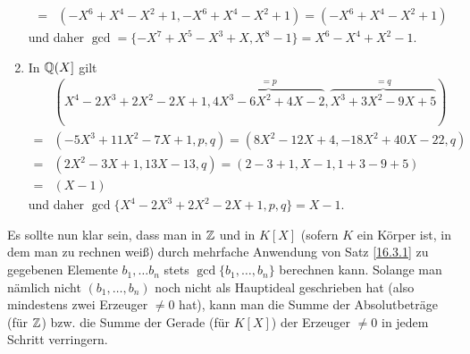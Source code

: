 \documentclass[../../main.tex]{subfiles}
\begin{document}
\begin{bsp}
\begin{enumerate}[\normalfont(a)]
\begin{align*}
=&(-X^6+X^4-X^2+1,-X^6+X^4-X^2+1)=(-X^6+X^4-X^2+1)
\end{align*}
und daher $\gcd=\{-X^7+X^5-X^3+X,X^8-1\}=X^6-X^4+X^2-1$.
\item In $\mathbb Q(X]$ gilt
\begin{align*}
&(X^4-2X^3+2X^2-2X+1,\overbrace{4X^3-6X^2+4X-2}^{=p},\overbrace{X^3+3X^2-9X+5}^{=q})\\
=&(-5X^3+11X^2-7X+1,p,q)=(8X^2-12X+4, -18X^2+40X-22,q)\\
=&(2X^2-3X+1,13X-13,q)=(2-3+1,X-1,1+3-9+5)\\
=&(X-1)
\end{align*}
und daher $\gcd\{X^4-2X^3+2X^2-2X+1,p,q\}=X-1$.
\end{enumerate}
\end{bsp}

\noindent Es sollte nun klar sein, dass man in $\mathbb Z$ und in $K[X]$ (sofern $K$ ein Körper ist, in dem man zu rechnen weiß) durch mehrfache Anwendung von Satz \ref{16.3.1} zu gegebenen Elemente $b_1,\ldots b_n$ stets $\gcd\{b_1,\ldots ,b_n\}$ berechnen kann. Solange man nämlich nicht $(b_1,\ldots ,b_n)$ noch nicht als Hauptideal geschrieben hat (also mindestens zwei Erzeuger $\neq 0$ hat), kann man die Summe der Absolutbeträge (für $\mathbb Z$) bzw. die Summe der Gerade (für $K[X]$) der Erzeuger $\neq 0$ in jedem Schritt verringern.\\
\end{document}
